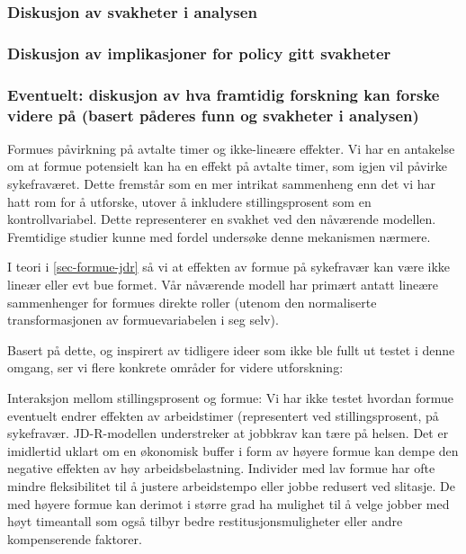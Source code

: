 \documentclass[
  12pt,
  a4paper,
  DIV=11,
  numbers=noendperiod]{scrartcl}
\begin{document}
\subsubsection{Diskusjon av svakheter i
analysen}\label{diskusjon-av-svakheter-i-analysen}

\subsubsection{Diskusjon av implikasjoner for policy gitt
svakheter}\label{diskusjon-av-implikasjoner-for-policy-gitt-svakheter}

\subsubsection{Eventuelt: diskusjon av hva framtidig forskning kan
forske videre på (basert påderes funn og svakheter i
analysen)}\label{eventuelt-diskusjon-av-hva-framtidig-forskning-kan-forske-videre-puxe5-basert-puxe5deres-funn-og-svakheter-i-analysen}

Formues påvirkning på avtalte timer og ikke-lineære effekter. Vi har en
antakelse om at formue potensielt kan ha en effekt på avtalte timer, som
igjen vil påvirke sykefraværet. Dette fremstår som en mer intrikat
sammenheng enn det vi har hatt rom for å utforske, utover å inkludere
stillingsprosent som en kontrollvariabel. Dette representerer en svakhet
ved den nåværende modellen. Fremtidige studier kunne med fordel
undersøke denne mekanismen nærmere.

I teori i \autoref{sec-formue-jdr} så vi at effekten av formue på
sykefravær kan være ikke lineær eller evt bue formet. Vår nåværende
modell har primært antatt lineære sammenhenger for formues direkte
roller (utenom den normaliserte transformasjonen av formuevariabelen i
seg selv).

Basert på dette, og inspirert av tidligere ideer som ikke ble fullt ut
testet i denne omgang, ser vi flere konkrete områder for videre
utforskning:

Interaksjon mellom stillingsprosent og formue: Vi har ikke testet
hvordan formue eventuelt endrer effekten av arbeidstimer (representert
ved stillingsprosent, på sykefravær. JD-R-modellen understreker at
jobbkrav kan tære på helsen. Det er imidlertid uklart om en økonomisk
buffer i form av høyere formue kan dempe den negative effekten av høy
arbeidsbelastning. Individer med lav formue har ofte mindre
fleksibilitet til å justere arbeidstempo eller jobbe redusert ved
slitasje. De med høyere formue kan derimot i større grad ha mulighet til
å velge jobber med høyt timeantall som også tilbyr bedre
restitusjonsmuligheter eller andre kompenserende faktorer.
\end{document}
